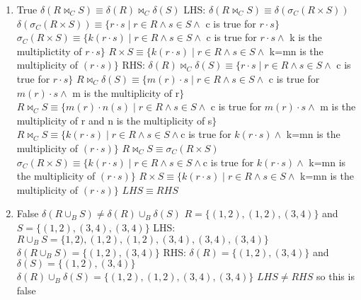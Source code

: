 \documentclass{4320hw}
\begin{document}
\begin{exercises}
\begin{enumerate}
\item
True
\newline
$\delta(R \bowtie_C S) \equiv \delta(R) \bowtie_C \delta(S)$
\newline
LHS:
\newline
$\delta(R \bowtie_C S) \equiv \delta( \sigma_C (R \times S))$
\newline
$\delta( \sigma_C (R \times S)) \equiv \{ r \cdot s \mid r \in R \wedge s \in S \wedge $ c is true for $r \cdot s\}$
\newline
$ \sigma_C (R \times S) \equiv \{ k(r \cdot s) \mid r \in R \wedge s \in S \wedge $ c is true for $r \cdot s \wedge $ k is the multiplictity of $ r\cdot s\}$
\newline
$R \times S  \equiv \{k(r \cdot s) \mid r \in R \wedge s \in S \wedge $ k=mn is the multiplicity of $(r \cdot s) \}$
\newline
RHS:
\newline
$\delta(R) \bowtie_C \delta(S) \equiv \{ r \cdot s \mid r \in R \wedge s \in S \wedge $ c is true for $r \cdot s\}$
\newline
$R  \bowtie_C \delta(S) \equiv \{ m(r) \cdot s \mid r \in R \wedge s \in S \wedge $ c is true for $m(r) \cdot s \wedge$ m is the multiplicity of r$\}$
\newline
$R  \bowtie_C S \equiv \{ m(r) \cdot n(s) \mid r \in R \wedge s \in S \wedge $ c is true for $m(r) \cdot s \wedge$ m is the multiplicity of r  and n is the multiplicity of s$\}$
\newline
$R  \bowtie_C S \equiv \{k(r \cdot s) \mid r \in R \wedge s \in S \wedge $c is true for $ k(r \cdot s) \wedge$ k=mn is the multiplicity of $(r \cdot s) \}$
\newline
$R  \bowtie_C S  \equiv \sigma_C (R \times S)$
\newline
$\sigma_C (R \times S) \equiv \{k(r \cdot s) \mid r \in R \wedge s \in S \wedge $c is true for $ k(r \cdot s) \wedge$ k=mn is the multiplicity of $(r \cdot s) \}$
\newline
$R \times S  \equiv \{k(r \cdot s) \mid r \in R \wedge s \in S \wedge $ k=mn is the multiplicity of $(r \cdot s) \}$
\newline
$LHS \equiv RHS$

\item
False
\newline
$\delta(R \cup_B S) \neq \delta(R) \cup_B \delta(S)$
\newline
$R=\{ (1,2), (1,2), (3,4)\}$ and $S=\{ (1,2), (3,4), (3,4) \}$
\newline
LHS:
\newline
$R \cup_B S= \{ 1,2), (1,2), (1,2), (3,4), (3,4), (3,4) \}$
\newline
$\delta(R \cup_B S) = \{ (1,2), (3,4) \}$
\newline
RHS:
\newline
$\delta(R)=\{ (1,2), (3,4) \}$ and $\delta(S)=\{ (1,2), (3,4) \}$
\newline
$\delta(R) \cup_B \delta(S)= \{(1,2),(1,2),(3,4),(3,4) \}$
\newline
$LHS \neq RHS$ so this is false


\end{enumerate}
\end{exercises}
\end{document}
